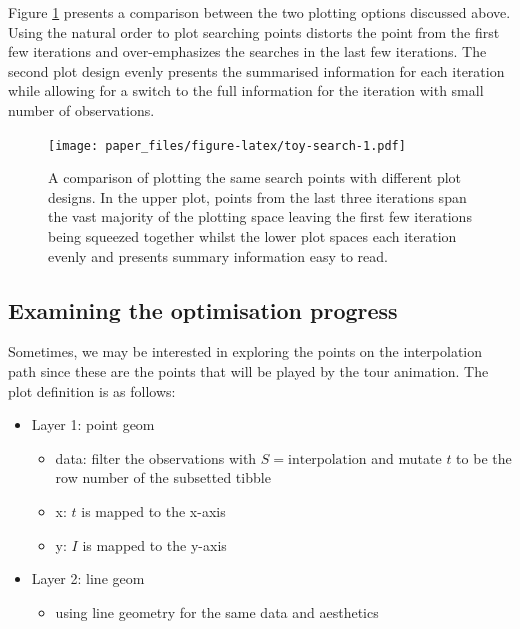 \documentclass[12pt]{article}
\providecommand{\tightlist}{%
  \setlength{\itemsep}{0pt}\setlength{\parskip}{0pt}}
\begin{document}
Figure \ref{toy-search} presents a comparison between the two plotting
options discussed above. Using the natural order to plot searching
points distorts the point from the first few iterations and
over-emphasizes the searches in the last few iterations. The second plot
design evenly presents the summarised information for each iteration
while allowing for a switch to the full information for the iteration
with small number of observations.

\begin{figure}
\centering
\texttt{[image: paper\_files/figure-latex/toy-search-1.pdf]}
\caption{\label{toy-search}A comparison of plotting the same search
points with different plot designs. In the upper plot, points from the
last three iterations span the vast majority of the plotting space
leaving the first few iterations being squeezed together whilst the
lower plot spaces each iteration evenly and presents summary information
easy to read.}
\end{figure}

\newpage

\hypertarget{examining-the-optimisation-progress}{%
\subsection{Examining the optimisation
progress}\label{examining-the-optimisation-progress}}

Sometimes, we may be interested in exploring the points on the
interpolation path since these are the points that will be played by the
tour animation. The plot definition is as follows:

\begin{itemize}
\tightlist
\item
  Layer 1: point geom

  \begin{itemize}
  \tightlist
  \item
    data: filter the observations with \(S = \text{interpolation}\) and
    mutate \(t\) to be the row number of the subsetted tibble
  \item
    x: \(t\) is mapped to the x-axis
  \item
    y: \(I\) is mapped to the y-axis
  \end{itemize}
\item
  Layer 2: line geom

  \begin{itemize}
  \tightlist
  \item
    using line geometry for the same data and aesthetics
  \end{itemize}
\end{itemize}
\end{document}
